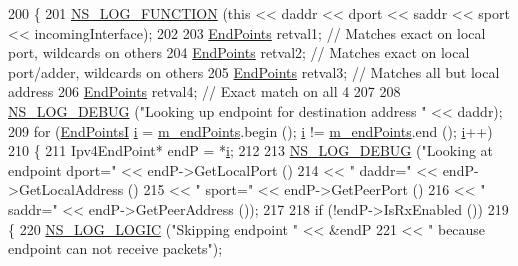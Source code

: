 \begin{DoxyCode}
200 \{
201   \hyperlink{log-macros-disabled_8h_a90b90d5bad1f39cb1b64923ea94c0761}{NS\_LOG\_FUNCTION} (\textcolor{keyword}{this} << daddr << dport << saddr << sport << incomingInterface);
202   
203   \hyperlink{classns3_1_1Ipv4EndPointDemux_a506a9661c08e2a64dab09ad6613d3b45}{EndPoints} retval1; \textcolor{comment}{// Matches exact on local port, wildcards on others}
204   \hyperlink{classns3_1_1Ipv4EndPointDemux_a506a9661c08e2a64dab09ad6613d3b45}{EndPoints} retval2; \textcolor{comment}{// Matches exact on local port/adder, wildcards on others}
205   \hyperlink{classns3_1_1Ipv4EndPointDemux_a506a9661c08e2a64dab09ad6613d3b45}{EndPoints} retval3; \textcolor{comment}{// Matches all but local address}
206   \hyperlink{classns3_1_1Ipv4EndPointDemux_a506a9661c08e2a64dab09ad6613d3b45}{EndPoints} retval4; \textcolor{comment}{// Exact match on all 4}
207 
208   \hyperlink{group__logging_ga413f1886406d49f59a6a0a89b77b4d0a}{NS\_LOG\_DEBUG} (\textcolor{stringliteral}{"Looking up endpoint for destination address "} << daddr);
209   \textcolor{keywordflow}{for} (\hyperlink{classns3_1_1Ipv4EndPointDemux_ad3ce6fd3c128dcb46d10d562c82b4e07}{EndPointsI} \hyperlink{bernuolliDistribution_8m_a6f6ccfcf58b31cb6412107d9d5281426}{i} = \hyperlink{classns3_1_1Ipv4EndPointDemux_a3a0f7107698fe56cf60b2a0647682cdf}{m\_endPoints}.begin (); \hyperlink{bernuolliDistribution_8m_a6f6ccfcf58b31cb6412107d9d5281426}{i} != 
      \hyperlink{classns3_1_1Ipv4EndPointDemux_a3a0f7107698fe56cf60b2a0647682cdf}{m\_endPoints}.end (); \hyperlink{bernuolliDistribution_8m_a6f6ccfcf58b31cb6412107d9d5281426}{i}++) 
210     \{
211       Ipv4EndPoint* endP = *\hyperlink{bernuolliDistribution_8m_a6f6ccfcf58b31cb6412107d9d5281426}{i};
212 
213       \hyperlink{group__logging_ga413f1886406d49f59a6a0a89b77b4d0a}{NS\_LOG\_DEBUG} (\textcolor{stringliteral}{"Looking at endpoint dport="} << endP->GetLocalPort ()
214                                                  << \textcolor{stringliteral}{" daddr="} << endP->GetLocalAddress ()
215                                                  << \textcolor{stringliteral}{" sport="} << endP->GetPeerPort ()
216                                                  << \textcolor{stringliteral}{" saddr="} << endP->GetPeerAddress ());
217 
218       \textcolor{keywordflow}{if} (!endP->IsRxEnabled ())
219         \{
220           \hyperlink{group__logging_ga88acd260151caf2db9c0fc84997f45ce}{NS\_LOG\_LOGIC} (\textcolor{stringliteral}{"Skipping endpoint "} << &endP
221                         << \textcolor{stringliteral}{" because endpoint can not receive packets"});

\end{DoxyCode}
